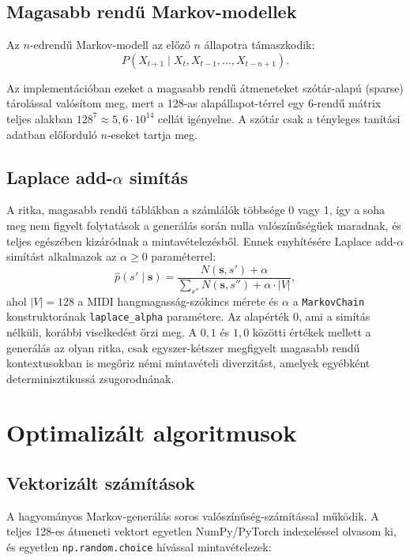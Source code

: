 \subsection{Magasabb rendű Markov-modellek}

Az $n$-edrendű Markov-modell az előző $n$ állapotra támaszkodik:
\[
P(X_{t+1} \mid X_t, X_{t-1}, \ldots, X_{t-n+1}).
\]

Az implementációban ezeket a magasabb rendű átmeneteket szótár-alapú (sparse) tárolással valósítom meg, mert a 128-as alapállapot-térrel egy 6-rendű mátrix teljes alakban $128^7 \approx 5{,}6 \cdot 10^{14}$ cellát igényelne. A szótár csak a tényleges tanítási adatban előforduló $n$-eseket tartja meg.

\subsection{Laplace add-$\alpha$ simítás}

A ritka, magasabb rendű táblákban a számlálók többsége 0 vagy 1, így a soha meg nem figyelt folytatások a generálás során nulla valószínűségűek maradnak, és teljes egészében kizáródnak a mintavételezésből. Ennek enyhítésére Laplace add-$\alpha$ simítást alkalmazok az $\alpha \geq 0$ paraméterrel:
\[
\hat{p}(s' \mid \mathbf{s}) = \frac{N(\mathbf{s}, s') + \alpha}{\sum_{s''} N(\mathbf{s}, s'') + \alpha \cdot |V|},
\]
ahol $|V| = 128$ a MIDI hangmagasság-szókincs mérete és $\alpha$ a \texttt{MarkovChain} konstruktorának \texttt{laplace\_alpha} paramétere. Az alapérték $0$, ami a simítás nélküli, korábbi viselkedést őrzi meg. A $0{,}1$ és $1{,}0$ közötti értékek mellett a generálás az olyan ritka, csak egyszer-kétszer megfigyelt magasabb rendű kontextusokban is megőriz némi mintavételi diverzitást, amelyek egyébként determinisztikussá zsugorodnának.

\section{Optimalizált algoritmusok}

\subsection{Vektorizált számítások}

A hagyományos Markov-generálás soros valószínűség-számítással működik. A teljes 128-es átmeneti vektort egyetlen NumPy/PyTorch indexeléssel olvasom ki, és egyetlen \texttt{np.random.choice} hívással mintavételezek:

